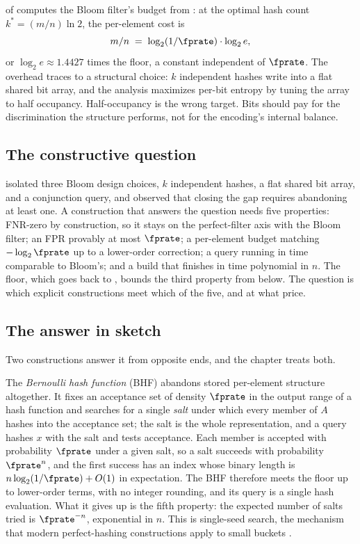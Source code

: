  of  computes the Bloom
filter's budget from : at the optimal hash count
$k^* = (m/n)\ln 2$, the per-element cost is
\[
  m / n \;=\; \log_2(1/\fprate) \cdot \log_2 e,
\]
or $\log_2 e \approx 1.4427$ times the floor, a constant independent of
$\fprate$. The overhead traces to a structural choice: $k$ independent
hashes write into a flat shared bit array, and the analysis maximizes
per-bit entropy by tuning the array to half occupancy. Half-occupancy
is the wrong target. Bits should pay for the discrimination the
structure performs, not for the encoding's internal balance.

\subsection*{The constructive question}

 isolated three Bloom design choices, $k$
independent hashes, a flat shared bit array, and a conjunction query,
and observed that closing the gap requires abandoning at least one.
A construction that answers the question needs five properties:
FNR-zero by construction, so it stays on the perfect-filter axis with
the Bloom filter; an FPR provably at most $\fprate$; a per-element
budget matching $-\log_2 \fprate$ up to a lower-order correction; a
query running in time comparable to Bloom's; and a build that finishes
in time polynomial in $n$. The floor, which goes back to
\textcite{carter-et-al-1978}, bounds the third property from below. The
question is which explicit constructions meet which of the five, and at
what price.

\subsection*{The answer in sketch}

Two constructions answer it from opposite ends, and the chapter treats
both.

The \emph{Bernoulli hash function} (BHF)
abandons stored per-element structure altogether. It fixes an
acceptance set of density $\fprate$ in the output range of a hash
function and searches for a single \emph{salt}
under which every member of $A$ hashes into the acceptance set; the
salt is the whole representation, and a query hashes $x$ with the salt
and tests acceptance. Each member is accepted with probability
$\fprate$ under a given salt, so a salt succeeds with probability
$\fprate^n$, and the first success has an index whose binary length
is $n \log_2(1/\fprate) + O(1)$ in expectation. The BHF therefore meets
the floor up to lower-order terms, with no integer rounding, and its
query is a single hash evaluation. What it gives up is the fifth
property: the expected number of salts tried is $\fprate^{-n}$,
exponential in $n$. This is single-seed search, the mechanism that
modern perfect-hashing constructions apply to small buckets
\parencite{esposito-graf-vigna-2020,lehmann-sanders-walzer-2024,lehmann-et-al-2025}.

